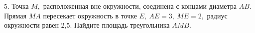 5. Точка $M,$ расположенная вне окружности, соединена с концами диаметра $AB.$ Прямая $MA$ пересекает окружность в точке $E,\ AE=3,\ ME=2,$ радиус окружности равен 2,5. Найдите площадь треугольника $AMB.$\\
